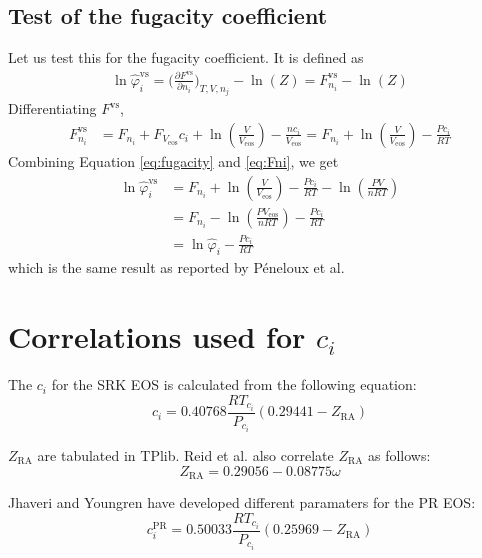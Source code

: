 \documentclass[english]{../thermomemo/thermomemo}
\begin{document}
\subsection{Test of the fugacity coefficient}
Let us test this for the fugacity coefficient. It is defined as
\begin{align}
  \ln \hat{\varphi}_i^{\text{vs}} = \biggl( \frac{\partial F^{\text{vs}}}{\partial n_i} \biggr)_{T,V,n_j} - \ln \left( Z \right) = F_{n_i}^{\text{vs}} - \ln \left( Z \right)
  \label{eq:fugacity}
\end{align}
Differentiating $F^{\text{vs}}$,
\begin{align}
  F_{n_i}^{\text{vs}} &= F_{n_i} + F_{V_{\text{eos}}}c_i  + \ln \left(\frac{V}{V_{\text{eos}}} \right) - \frac{n c_i}{V_{\text{eos}}} = F_{n_i} + \ln \left(\frac{V}{V_{\text{eos}}} \right) - \frac{P c_i}{RT}
  \label{eq:Fni}
\end{align}
Combining Equation \ref{eq:fugacity} and \ref{eq:Fni}, we get
\begin{align}
  \ln \hat{\varphi}_i^{\text{vs}} &= F_{n_i} + \ln \left(\frac{V}{V_{\text{eos}}} \right) - \frac{P c_i}{RT} - \ln \left( \frac{PV}{n RT} \right) \\
                      &= F_{n_i} - \ln \left( \frac{PV_{\text{eos}}}{n RT} \right) - \frac{P c_i}{RT} \\
  &= \ln \hat{\varphi}_i - \frac{P c_i}{RT}
  \label{eq:fugacity2}
\end{align}
which is the same result as reported by P{\'e}neloux et al.


\section{Correlations used for $c_i$}
The $c_i$ for the SRK EOS is calculated from the following equation:
\begin{equation}
  c_i = 0.40768\frac{R T_{c_i}}{P_{c_i}}\left(0.29441- Z_{\text{RA}}\right)
\label{eq:ci}
\end{equation}

$Z_{\text{RA}}$ are tabulated in TPlib. Reid et al. \cite{Reid1987}
also correlate $Z_{\text{RA}}$ as follows:
\begin{equation}
  Z_{\text{RA}} = 0.29056 - 0.08775 \omega
\label{eq:zra}
\end{equation}

Jhaveri and Youngren \cite{Jhaveri1988} have developed different paramaters for the PR EOS:
\begin{equation}
  c_i^{\text{PR}} = 0.50033\frac{R T_{c_i}}{P_{c_i}}\left(0.25969- Z_{\text{RA}}\right)
\label{eq:ci_PR}
\end{equation}
\clearpage


\end{document}
